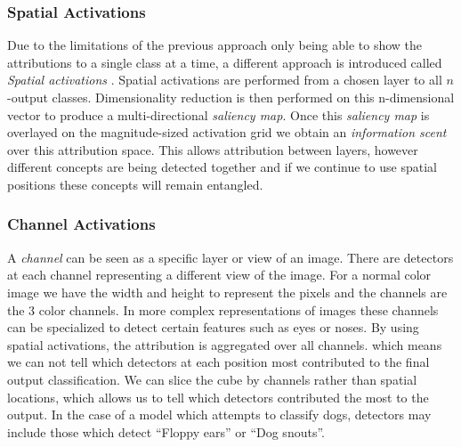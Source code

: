 \subsubsection{Spatial Activations}
Due to the limitations of the previous approach only being able to show the attributions to a single class at a time, a different approach is introduced called \emph{Spatial activations} \cite{olah2018the}. Spatial activations are performed from a chosen layer to all $n$-output classes. Dimensionality reduction is then performed on this n-dimensional vector to produce a multi-directional \emph{saliency map}. Once this \emph{saliency map} is overlayed on the magnitude-sized activation grid we obtain an \emph{information scent} over this attribution space. This allows attribution between layers, however different concepts are being detected together and if we continue to use spatial positions these concepts will remain entangled.

\subsubsection{Channel Activations}
A \emph{channel} can be seen as a specific layer or view of an image. There are detectors at each channel representing a different view of the image. For a  normal color image we have the width and height to represent the pixels and the channels are the 3 color channels. In more complex representations of images these channels can be specialized to detect certain features such as eyes or noses.  By using spatial activations, the attribution is aggregated over all channels. which means we can not tell which detectors at each position most contributed to the final output classification. We can slice the cube by channels rather than spatial locations, which allows us to tell which detectors contributed the most to the output. In the case of a model which attempts to classify dogs, detectors may include those which detect ``Floppy ears'' or ``Dog snouts''.
